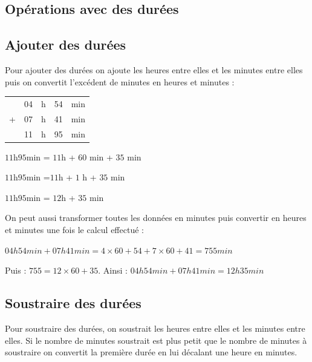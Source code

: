 \begin{pageCours}
\section{Opérations avec des durées}

\subsection{Ajouter des durées}

\begin{Mt}
Pour ajouter des durées on ajoute les heures entre elles et les minutes entre elles puis on convertit l'excédent de minutes en heures et minutes :

\begin{minipage}{0.15\linewidth}
\begin{tabular}{ccccc} 
& 04 & h & 54 & min \\ 
+  & 07 & h & 41 & min\\ 
\hline 
& 11 & h & 95 & min \\
\end{tabular} 
\end{minipage}
\hfill
\begin{minipage}{0.7\linewidth}
  $11$h$95$min = $11$h + $60$ min + $35$ min 
 
  $11$h$95$min =$11$h + $1$ h + $35$ min 
 
  $11$h$95$min = $12$h + $35$ min
\end{minipage}

\end{Mt}
\begin{Mt}
On peut aussi transformer toutes les données en minutes puis convertir en heures et minutes une fois le calcul effectué :

$04h54min+07h41min=4\times60+54+7\times60+41=755min$

Puis : $755=12\times60+35$. Ainsi : $04h54min+07h41min=12h35min$
\end{Mt}



\subsection{Soustraire des durées}

\begin{Mt}
Pour soustraire des durées, on soustrait les heures entre elles et les minutes entre elles. Si {\color{sacado_red} le nombre de minutes} soustrait est plus petit que le {\color{sacado_blue} nombre de minutes à soustraire} on convertit la première durée en lui décalant une heure en minutes.
 

\end{Mt}
\end{pageCours}
